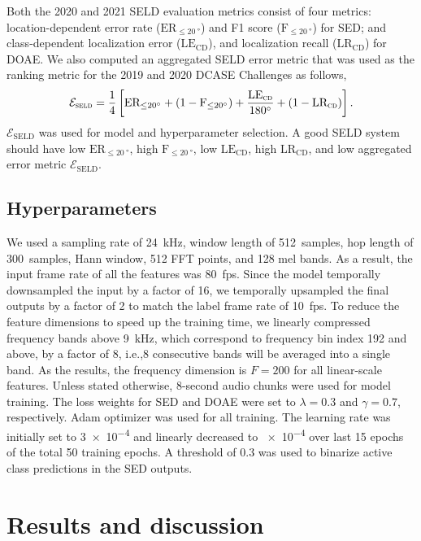 \documentclass[journal]{IEEEtran}
\newcommand*{\ie}{i.e.,\xspace}
\begin{document}
Both the 2020 and 2021 SELD evaluation metrics consist of four metrics: location-dependent error rate ($\text{ER}_{\le \SI{20}{\degree}}$) and F1 score ($\text{F}_{\le \SI{20}{\degree}}$) for SED; and class-dependent localization error ($\text{LE}_\text{CD}$), and localization recall ($\text{LR}_\text{CD}$) for DOAE. We also computed an aggregated SELD error metric that was used as the ranking metric for the 2019 and 2020 DCASE Challenges as follows, 
\begin{align}
    \mathcal{E}_\textsc{seld} = \dfrac{1}{4}\left[\text{ER}_{\le \SI{20}{\degree}} + (1-\text{F}_{\le \SI{20}{\degree}}) + \dfrac{\text{LE}_\textsc{cd}}{\SI{180}{\degree}} + (1-\text{LR}_\textsc{cd})\right].
\end{align}
$\mathcal{E}_\text{SELD}$ was used for model and hyperparameter selection. A good SELD system should have low $\text{ER}_{\le \SI{20}{\degree}}$, high $\text{F}_{\le \SI{20}{\degree}}$, low $\text{LE}_\text{CD}$, high $\text{LR}_\text{CD}$, and low aggregated error metric $\mathcal{E}_\text{SELD}$.

\subsection{Hyperparameters}

We used a sampling rate of \SI{24}{\kilo\hertz}, window length of \SI{512}{ samples}, hop length of \SI{300}{samples}, Hann window, \num{512} FFT points, and \num{128} mel bands. As a result, the input frame rate of all the features was \SI{80}{fps}. Since the model temporally downsampled the input by a factor of \num{16}, we temporally upsampled the final outputs by a factor of \num{2} to match the label frame rate of \SI{10}{fps}. To reduce the feature dimensions to speed up the training time, we linearly compressed frequency bands above \SI{9}{\kilo\hertz}, which correspond to frequency bin index \num{192} and above, by a factor of \num{8}, \ie \num{8} consecutive bands will be averaged into a single band. As the results, the frequency dimension is $F=200$ for all linear-scale features. Unless stated otherwise, \num{8}-second audio chunks were used for model training. The loss weights for SED and DOAE were set to $\lambda=0.3$ and $\gamma=0.7$, respectively. Adam optimizer was used for all training. The learning rate was initially set to \num{3e-4} and linearly decreased to \num{e-4} over last \num{15} epochs of the total \num{50} training epochs. A threshold of \num{0.3} was used to binarize active class predictions in the SED outputs.  \section{Results and discussion}
\label{sec:results}
\end{document}
